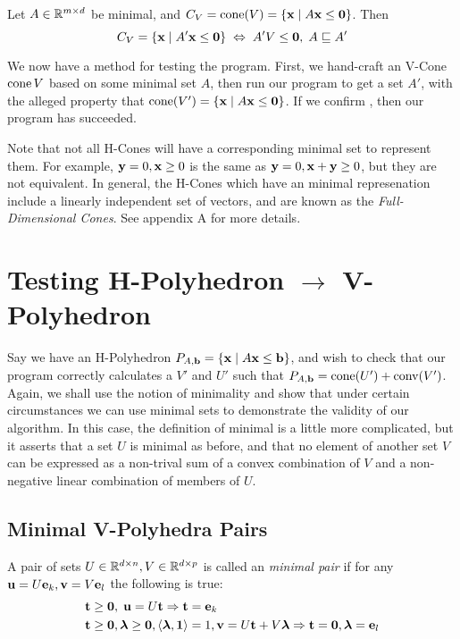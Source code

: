 \begin{EqCriteria}\label{eq_vc_hc}
	Let $A\in\mathbb{R}^{m\times d}$ be minimal, and $C_V = \operatorname{cone}(V) = \left\{\mathbf{x}\;|\; A\mathbf{x}\leq\mathbf{0}\right\}$.  Then
	\[ C_V = \left\{\mathbf{x}\;|\; A'\mathbf{x}\leq\mathbf{0}\right\} \;\Leftrightarrow\; A'V\leq\mathbf{0},\; A \sqsubseteq A' \]
\end{EqCriteria}

\begin{Test}\label{test_vc_to_hc}
	We now have a method for testing the program.  First, we hand-craft an V-Cone $\operatorname{cone}{V}$ based on some minimal set $A$, then run our program to get a set $A'$, with the alleged property that $\operatorname{cone}(V') = \left\{\mathbf{x}\;|\; A\mathbf{x}\leq\mathbf{0}\right\}$.  If we confirm , then our program has succeeded.
\end{Test}

\begin{Remark}%
	Note that not all H-Cones will have a corresponding minimal set to represent them.  For example, $\mathbf{y} = 0, \mathbf{x} \geq 0$ is the same as $\mathbf{y} = 0, \mathbf{x} + \mathbf{y} \geq 0$, but they are not equivalent.  In general, the H-Cones which have an minimal represenation include a linearly independent set of vectors, and are known as the \textit{Full-Dimensional Cones}.  See appendix A for more details.
\end{Remark}

\section{Testing H-Polyhedron $\to$ V-Polyhedron}

Say we have an H-Polyhedron $P_{A,\mathbf{b}} = \left\{\mathbf{x}\;|\; A\mathbf{x}\leq \mathbf{b}\right\}$, and wish to check that our program correctly calculates a $V'$ and $U'$ such that $P_{A,\mathbf{b}} = \operatorname{cone}(U') + \operatorname{conv}(V')$.  Again, we shall use the notion of minimality and show that under certain circumstances we can use minimal sets to demonstrate the validity of our algorithm.  In this case, the definition of minimal is a little more complicated, but it asserts that a set $U$ is minimal as before, and that no element of another set $V$ can be expressed as a non-trival sum of a convex combination of $V$ and a non-negative linear combination of members of $U$.

\subsection{Minimal V-Polyhedra Pairs}
\begin{Def}{ A pair of sets $U\in\mathbb{R}^{d\times n}, V\in\mathbb{R}^{d\times p}$ is called an \textit{minimal pair} if for any $\mathbf{u} = U\mathbf{e}_k, \mathbf{v} = V\mathbf{e}_l$ the following is true:
		\begin{alignat*}{1}
			 & \mathbf{t} \geq \mathbf{0},\; \mathbf{u} = U\mathbf{t} \Rightarrow \mathbf{t} = \mathbf{e}_k                              \\
			 & \mathbf{t} \geq \mathbf{0}, \bm{\lambda} \geq \mathbf{0}, \left\langle \bm{\lambda}, \mathbf{1} \right\rangle = 1, \mathbf{v} = U\mathbf{t} + V\bm{\lambda}
			\Rightarrow \mathbf{t} = \mathbf{0}, \bm{\lambda} = \mathbf{e}_l
		\end{alignat*}
	}\end{Def}

